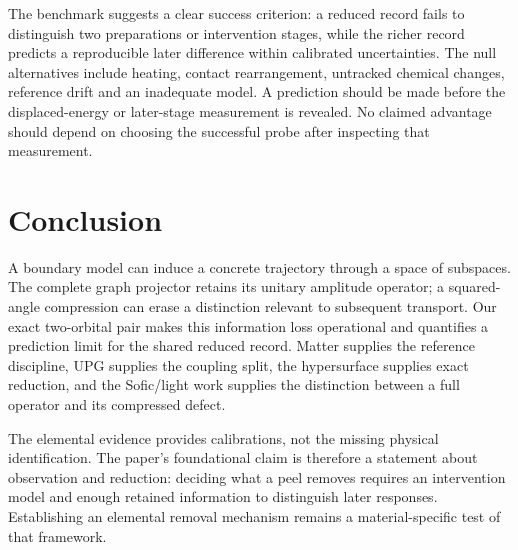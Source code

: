 \documentclass[11pt]{article}
\begin{document}
The benchmark suggests a clear success criterion: a reduced record fails to distinguish two preparations or intervention stages, while the richer record predicts a reproducible later difference within calibrated uncertainties. The null alternatives include heating, contact rearrangement, untracked chemical changes, reference drift and an inadequate model. A prediction should be made before the displaced-energy or later-stage measurement is revealed. No claimed advantage should depend on choosing the successful probe after inspecting that measurement.

\section{Conclusion}
A boundary model can induce a concrete trajectory through a space of subspaces. The complete graph projector retains its unitary amplitude operator; a squared-angle compression can erase a distinction relevant to subsequent transport. Our exact two-orbital pair makes this information loss operational and quantifies a prediction limit for the shared reduced record. Matter supplies the reference discipline, UPG supplies the coupling split, the hypersurface supplies exact reduction, and the Sofic/light work supplies the distinction between a full operator and its compressed defect.

The elemental evidence provides calibrations, not the missing physical identification. The paper's foundational claim is therefore a statement about observation and reduction: deciding what a peel removes requires an intervention model and enough retained information to distinguish later responses. Establishing an elemental removal mechanism remains a material-specific test of that framework.

\appendix
\end{document}
